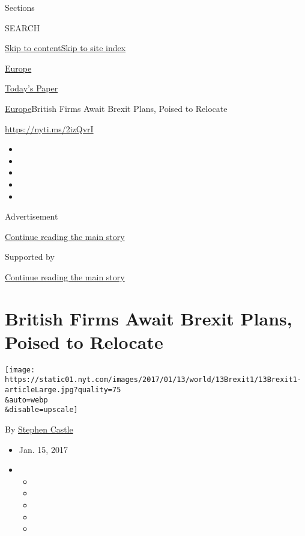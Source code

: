 Sections

SEARCH

\protect\hyperlink{site-content}{Skip to
content}\protect\hyperlink{site-index}{Skip to site index}

\href{https://www.nytimes.com/section/world/europe}{Europe}

\href{https://myaccount.nytimes.com/auth/login?response_type=cookie\&client_id=vi}{}

\href{https://www.nytimes.com/section/todayspaper}{Today's Paper}

\href{/section/world/europe}{Europe}\textbar{}British Firms Await Brexit
Plans, Poised to Relocate

\url{https://nyti.ms/2izQvrI}

\begin{itemize}
\item
\item
\item
\item
\item
\end{itemize}

Advertisement

\protect\hyperlink{after-top}{Continue reading the main story}

Supported by

\protect\hyperlink{after-sponsor}{Continue reading the main story}

\hypertarget{british-firms-await-brexit-plans-poised-to-relocate}{%
\section{British Firms Await Brexit Plans, Poised to
Relocate}\label{british-firms-await-brexit-plans-poised-to-relocate}}

\texttt{[image: https://static01.nyt.com/images/2017/01/13/world/13Brexit1/13Brexit1-articleLarge.jpg?quality=75\\\&auto=webp\\\&disable=upscale]}

By \href{http://www.nytimes.com/by/stephen-castle}{Stephen Castle}

\begin{itemize}
\item
  Jan. 15, 2017
\item
  \begin{itemize}
  \item
  \item
  \item
  \item
  \item
  \end{itemize}
\end{itemize}

